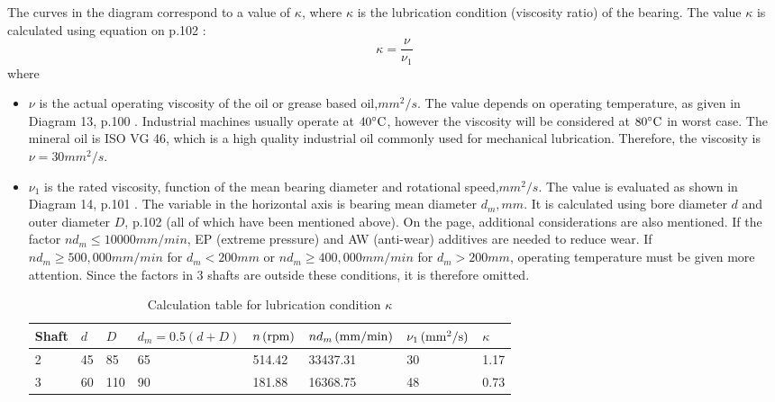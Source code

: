 \begin{itemize}
	The curves in the diagram correspond to a value of $ \kappa $, where $ \kappa $ is the lubrication condition (viscosity ratio) of the bearing. The value $ \kappa $ is calculated using equation on p.102 \cite{rolling_bearings}:
	\[
	\kappa = \dfrac{\nu}{\nu_1}
	\]
	where
	\begin{itemize}
		\item $ \nu $ is the actual operating viscosity of the oil or grease based oil,$ \unit{mm^2/s} $. The value depends on operating temperature, as given in Diagram 13, p.100 \cite{rolling_bearings}. Industrial machines usually operate at $ 40^\circ \text{C} $, however the viscosity will be considered at $ 80^\circ \text{C} $ in worst case. The mineral oil is ISO VG 46, which is a high quality industrial oil commonly used for mechanical lubrication. Therefore, the viscosity is $ \nu = 30 \unit{mm^2/s} $.
		\item $ \nu_1 $ is the rated viscosity, function of the mean bearing diameter and rotational speed,$ \unit{mm^2/s} $. The value is evaluated as shown in Diagram 14, p.101 \cite{rolling_bearings}. The variable in the horizontal axis is bearing mean diameter $ d_m, \unit{mm} $. It is calculated using bore diameter $ d $ and outer diameter $ D $, p.102 \cite{rolling_bearings} (all of which have been mentioned above). On the page, additional considerations are also mentioned. If the factor $ nd_m\leq 10000\unit{mm/min} $, EP (extreme pressure) and AW (anti-wear) additives are needed to reduce wear. If $ nd_m \geq 500,000\unit{mm/min} $ for $ d_m < 200 \unit{mm} $ or $ nd_m \geq 400,000 \unit{mm/min} $ for $ d_m > 200 \unit{mm} $, operating temperature must be given more attention. Since the factors in 3 shafts are outside these conditions, it is therefore omitted.
		\begin{table}[ht]
			\centering
			\caption{Calculation table for lubrication condition $ \kappa $}
			\begin{tabular}{llllllll}\toprule
				Shaft & $ d $ & $ D $ & $ d_m = 0.5(d+D) $ & $ n \, (\mathrm{rpm}) $ & $ nd_m \, (\mathrm{mm/min}) $ & $ \nu_1 \, (\mathrm{mm^2/s}) $ & $ \kappa $ \\\midrule
				2 & 45 & 85 & 65 & 514.42 & 33437.31 & 30 & 1.17\\
				3 & 60 & 110 & 90 & 181.88 & 16368.75 & 48 & 0.73\\\bottomrule
			\end{tabular}
		\end{table}
	\end{itemize}
	

\end{itemize}
